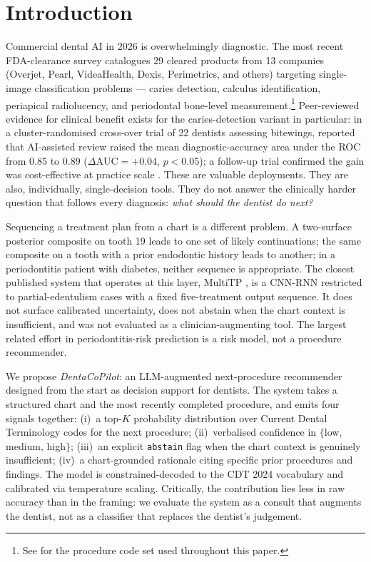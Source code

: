 \documentclass[preprint,authoryear,1p,12pt]{elsarticle}
\begin{document}
\linenumbers

\section{Introduction}
\label{sec:intro}

Commercial dental AI in 2026 is overwhelmingly diagnostic. The most
recent FDA-clearance survey \citep{shujaat2026fdaai} catalogues 29
cleared products from 13 companies (Overjet, Pearl, VideaHealth, Dexis,
Perimetrics, and others) targeting single-image classification problems
--- caries detection, calculus identification, periapical radiolucency,
and periodontal bone-level measurement.\footnote{See
\cite{ada2024cdt} for the procedure code set used throughout this
paper.} Peer-reviewed evidence for clinical benefit exists for the
caries-detection variant in particular: in a cluster-randomised
cross-over trial of 22 dentists assessing bitewings,
\cite{mertens2021caries} reported that AI-assisted review raised the
mean diagnostic-accuracy area under the ROC from $0.85$ to $0.89$
($\Delta\text{AUC}{=}+0.04$, $p{<}0.05$); a follow-up trial confirmed
the gain was cost-effective at practice scale
\citep{schwendicke2022costeffectiveness}. These are valuable
deployments. They are also, individually, single-decision tools. They
do not answer the clinically harder question that follows every
diagnosis: \emph{what should the dentist do next?}

Sequencing a treatment plan from a chart is a different problem. A
two-surface posterior composite on tooth 19 leads to one set of likely
continuations; the same composite on a tooth with a prior endodontic
history leads to another; in a periodontitis patient with diabetes,
neither sequence is appropriate. The closest published system that
operates at this layer, MultiTP \citep{chen2024multitp}, is a CNN-RNN
restricted to partial-edentulism cases with a fixed five-treatment
output sequence. It does not surface calibrated uncertainty, does not
abstain when the chart context is insufficient, and was not evaluated as
a clinician-augmenting tool. The largest related effort in
periodontitis-risk prediction \citep{patel2026perio} is a risk model,
not a procedure recommender.

We propose \emph{DentaCoPilot}: an LLM-augmented next-procedure
recommender designed from the start as decision support for dentists. The
system takes a structured chart and the most recently completed procedure,
and emits four signals together: (i)~a top-$K$ probability distribution
over Current Dental Terminology codes for the next procedure;
(ii)~verbalised confidence in $\{$low, medium, high$\}$;
(iii)~an explicit \texttt{abstain} flag when the chart context is
genuinely insufficient; (iv)~a chart-grounded rationale citing specific
prior procedures and findings. The model is constrained-decoded to the
CDT 2024 vocabulary and calibrated via temperature scaling. Critically,
the contribution lies less in raw accuracy than in the framing: we
evaluate the system as a consult that augments the dentist, not as a
classifier that replaces the dentist's judgement.
\end{document}
